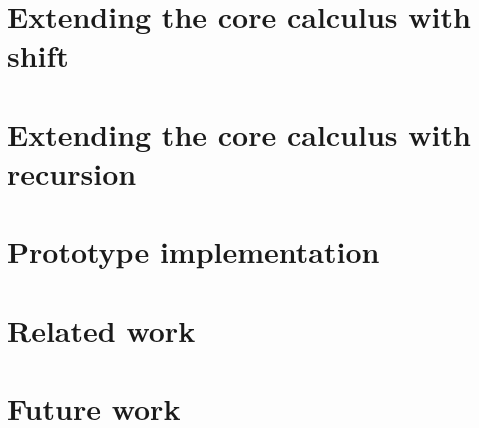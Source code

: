\documentclass{article}
\begin{document}
\section{Extending the core calculus with shift}
\section{Extending the core calculus with recursion}
\section{Prototype implementation}
\section{Related work}
\section{Future work}
\end{document}
